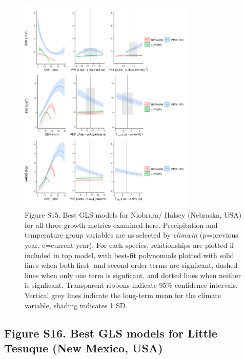 \documentclass[
]{article}
\begin{document}
\begin{figure}
\centering
\includegraphics[width=0.75\textwidth,height=\textheight]{tables_figures/SI_figures/composite_plots/Nebraska.png}
\caption{Figure S15. Best GLS models for Niobrara/ Halsey (Nebraska,
USA) for all three growth metrics examined here. Precipitation and
temperature group variables are as selected by \emph{climwin}
(p=previous year, c=current year). For each species, relationships are
plotted if included in top model, with best-fit polynomials plotted with
solid lines when both first- and second-order terms are signficant,
dashed lines when only one term is signficant, and dotted lines when
neither is signficant. Transparent ribbons indicate 95\% confidence
intervals. Vertical grey lines indicate the long-term mean for the
climate variable, shading indicates 1 SD.}
\end{figure}

\newpage

\hypertarget{figure-s16.-best-gls-models-for-little-tesuque-new-mexico-usa}{%
\subsection{Figure S16. Best GLS models for Little Tesuque (New Mexico,
USA)}\label{figure-s16.-best-gls-models-for-little-tesuque-new-mexico-usa}}
\end{document}
